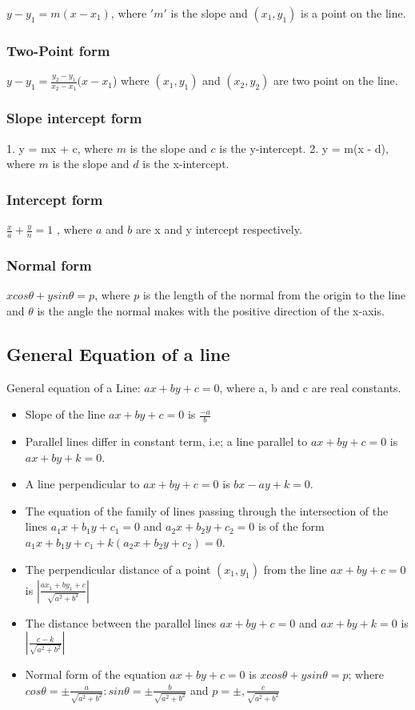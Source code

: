 \documentclass[12pt]{article}
\begin{document}
\begin{multicols}{2}
$y - y_1 = m(x - x_1)$, where $'m'$ is the slope and $(x_1, y_1)$ is a point on the line.

\subsubsection*{Two-Point form}

$y - y_1 = \frac{y_2-y_1}{x_2-x_1 }(x - x_1$) where $(x_1, y_1)$ and $(x_2, y_2)$ are two point on the line.

\subsubsection*{Slope intercept form}

1. y = mx + c, where $m$ is the slope and $c$ is the y-intercept.
2. y = m(x - d), where $m$ is the slope and $d$ is the x-intercept.

\subsubsection*{Intercept form}
$\frac{x}{a}+\frac{y}{n}=1$ , where $a$ and $b$ are x and y intercept respectively.

\subsubsection*{Normal form }
$ x cos \theta + y sin \theta = p$, where $p$ is the length of the normal from the origin to the line and $\theta$ is the angle the normal makes with the positive direction of the x-axis.

\subsection*{General Equation of a line }
General equation of a Line: $ax + by + c = 0$, where a, b and c are real constants.

\begin{itemize}
    \item Slope of the line $ax + by + c = 0$ is $\frac{-a}{b}$
    \item  Parallel lines differ in constant term, i.e; a line parallel to $ax + by + c = 0$ is $ax + by + k = 0$.
    \item  A line perpendicular to $ax + by + c = 0$ is $bx - ay + k = 0$.
    \item The equation of the family of lines passing through the intersection of the lines $a_1x + b_1y + c_1 = 0$ and $a_2x + b_2y + c_2 = 0$ is of the form $a_1x + b_1y + c_1 + k(a_2x + b_2y + c_2) = 0$.
    \item The perpendicular distance of a point $(x_1, y_1)$ from the line $ax + by + c = 0$ is $|\frac{ax_1+by_1+c}{\sqrt{a^2+b^2}}|$
    \item The distance between the parallel lines $ax + by + c = 0$ and $ax + by + k = 0$ is $|\frac{c-k}{\sqrt{a^2+b^2}}|$
    \item Normal form of the equation $ax + by + c = 0$ is $x cos \theta + y sin \theta = p$; where $cos \theta =\pm \frac{a}{\sqrt{a^2+b^2}}:sin \theta =\pm \frac{b}{\sqrt{a^2+b^2}}$ and $p= \pm,\frac{c}{\sqrt{a^2+b^2}} $
\end{itemize}
\end{multicols}
\end{document}

